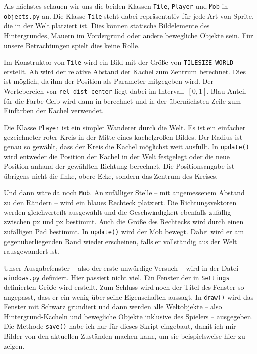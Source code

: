 
Als nächstes schauen wir uns die beiden Klassen \texttt{Tile}, \texttt{Player} und \texttt{Mob} in \texttt{objects.py} an. Die Klasse \texttt{Tile} steht dabei repräsentativ für jede Art von Sprite, die in der Welt platziert ist. Dies können statische Bildelemente des Hintergrundes, Mauern im Vordergrund oder andere bewegliche Objekte sein. Für unsere Betrachtungen spielt dies keine Rolle. 

Im Konstruktor von \texttt{Tile} wird ein Bild mit der Größe von \texttt{TILESIZE\_WORLD} erstellt. Ab  wird der relative Abstand der Kachel zum Zentrum berechnet. Dies ist möglich, da ihm der Position als Parameter mitgegeben wird. Der Wertebereich von \texttt{rel\_dist\_center} liegt dabei im Intervall~$[0,1]$. Blau-Anteil für die Farbe Gelb wird dann in  berechnet und in der übernächsten Zeile zum Einfärben der Kachel verwendet.

Die Klasse \texttt{Player} ist ein simpler Wanderer durch die Welt. Es ist ein einfacher gezeichneter roter Kreis in der Mitte eines kachelgroßen Bildes. Der Radius ist genau so gewählt, dass der Kreis die Kachel möglichst weit ausfüllt. In \texttt{update()} wird entweder die Position der Kachel in der Welt festgelegt oder die neue Position anhand der gewählten Richtung berechnet. Die Positionsangabe ist übrigens nicht die linke, obere Ecke, sondern das Zentrum des Kreises.

Und dann wäre da noch \texttt{Mob}. An zufälliger Stelle -- mit angemessenem Abstand zu den Rändern -- wird ein blaues Rechteck platziert. Die Richtungsvektoren werden gleichverteilt ausgewählt und die Geschwindigkeit ebenfalls zufällig zwischen \unit[100]{px} und \unit[500]{px} bestimmt. Auch die Größe des Rechtecks wird durch einen zufälligen Pad bestimmt. In \texttt{update()} wird der Mob bewegt. Dabei wird er am gegenüberliegenden Rand wieder erscheinen, falls er vollständig aus der Welt rausgewandert ist.


Unser Ausgabefenster -- also der erste unwürdige Versuch -- wird in der Datei \texttt{windows.py} definiert. Hier passiert nicht viel. Ein Fenster der in \texttt{Settings} definierten Größe wird erstellt. Zum Schluss wird noch der Titel des Fenster so angepasst, dass er ein wenig über seine Eigenschaften aussagt. In \texttt{draw()} wird das Fenster mit Schwarz grundiert und dann werden alle Weltobjekte -- also Hintergrund-Kacheln und bewegliche Objekte inklusive des Spielers -- ausgegeben. Die Methode \texttt{save()} habe ich nur für dieses Skript eingebaut, damit ich mir Bilder von den aktuellen Zuständen machen kann, um sie beispielsweise hier zu zeigen.

